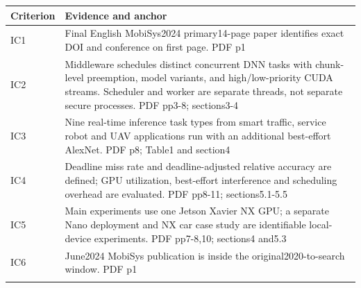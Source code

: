 \begin{longtable}{>{\raggedright\arraybackslash}p{}>{\raggedright\arraybackslash}p{}}
\toprule
\textbf{Criterion} & \textbf{Evidence and anchor}\\\midrule\endhead
IC1 & Final English MobiSys2024 primary14-page paper identifies exact DOI and conference on first page. PDF p1\\\addlinespace
IC2 & Middleware schedules distinct concurrent DNN tasks with chunk-level preemption,\allowbreak{} model variants,\allowbreak{} and high/low-priority CUDA streams. Scheduler and worker are separate threads,\allowbreak{} not separate secure processes. PDF pp3-8;\allowbreak{} sections3-4\\\addlinespace
IC3 & Nine real-time inference task types from smart traffic,\allowbreak{} service robot and UAV applications run with an additional best-effort AlexNet. PDF p8;\allowbreak{} Table1 and section4\\\addlinespace
IC4 & Deadline miss rate and deadline-adjusted relative accuracy are defined;\allowbreak{} GPU utilization,\allowbreak{} best-effort interference and scheduling overhead are evaluated. PDF pp8-11;\allowbreak{} sections5.1-5.5\\\addlinespace
IC5 & Main experiments use one Jetson Xavier NX GPU;\allowbreak{} a separate Nano deployment and NX car case study are identifiable local-device experiments. PDF pp7-8,\allowbreak{}10;\allowbreak{} sections4 and5.3\\\addlinespace
IC6 & June2024 MobiSys publication is inside the original2020-to-search window. PDF p1\\\addlinespace
\bottomrule\end{longtable}
